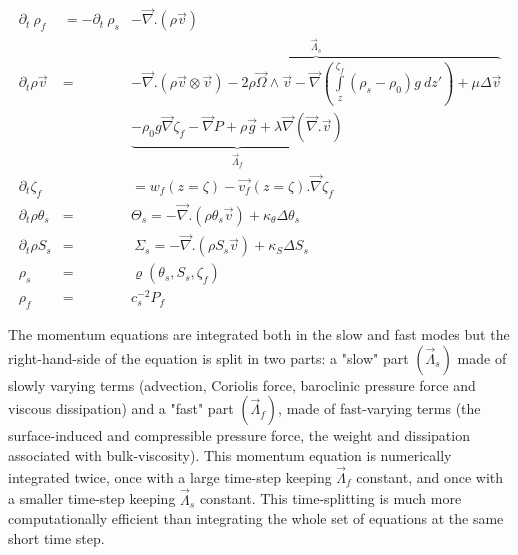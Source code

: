  \begin{eqnarray}  
 \label{NBQsyst}
   \partial_t\ \rho_f &= -\partial_t\ \rho_{s}
   &-\vec{\nabla}.(\rho\vec{v}) \nonumber \\
   \partial_t\rho\vec{v} &= 
   & \overbrace{-\vec{\nabla}.\left(\rho\vec{v}\otimes\vec{v}\right)
   -2\rho\vec{\Omega}\wedge\vec{v}
   -\vec\nabla(\int\limits_z^{\zeta_f}{(\rho_{s}-\rho_0)g\ dz'})
   +\mu\Delta\vec{v}}^{\vec{\Lambda}_{s}} \nonumber \\
   &&\underbrace{-\rho_{0}g\vec\nabla\zeta_f
   -\vec\nabla{P}
   +\rho\vec{g}
   +\lambda\vec{\nabla}(\vec{\nabla}.\vec{v})}_{\vec{\Lambda}_{f}}\\
   \partial_t{\zeta_f} &&= 
   w_f\scriptstyle(z=\zeta)\textstyle
   -\vec{v_f}\scriptstyle(z=\zeta)\textstyle.\vec{\nabla}{\zeta_f} \nonumber \\[3mm]
   \partial_t{\rho\theta_s} &=\ &\Theta_{s}=-\vec{\nabla}.\left(\rho\theta_s\vec{v}\right)
   +\kappa_{\theta}\Delta\theta_s \nonumber \\
   \partial_t{\rho S_s} &= &\ \Sigma_{s}= -\vec{\nabla}.(\rho S_s\vec{v})
   +\kappa_{S}\Delta{S_s} \nonumber \\
   \rho_s &= &\varrho(\theta_s,S_s,\zeta_f) \nonumber \\
   \rho_f &= &c_s^{-2} P_f \nonumber    
 \end{eqnarray} 
 
The momentum equations are integrated both in the slow and fast modes but the right-hand-side of the equation is split in two parts: a "slow" part $(\vec{\Lambda}_{s})$ made of slowly varying terms (advection, Coriolis force, baroclinic pressure force and viscous dissipation) and a "fast" part $(\vec{\Lambda}_{f})$, made of fast-varying terms (the surface-induced and compressible pressure force, the weight and dissipation associated with bulk-viscosity). This momentum equation is numerically integrated twice, once with a large time-step keeping $\vec{\Lambda}_{f}$ constant, and once with a smaller time-step keeping $\vec{\Lambda}_{s}$ constant. This time-splitting is much more computationally efficient than integrating the whole set of equations at the same short time step.%

